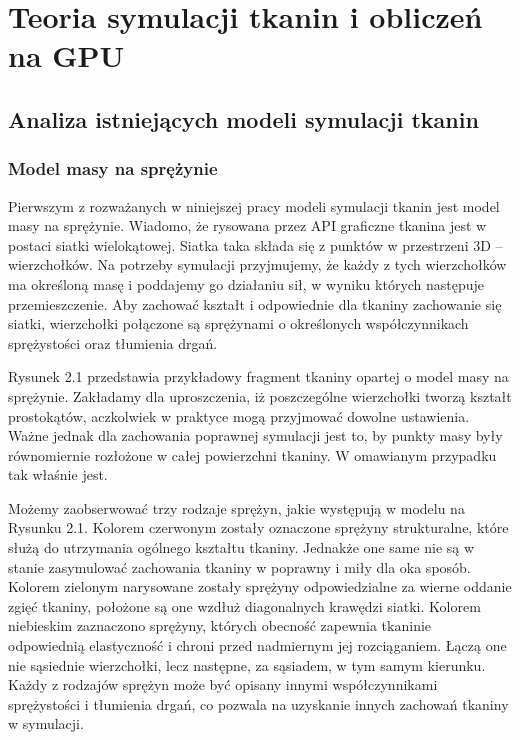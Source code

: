 \chapter{Teoria symulacji tkanin i obliczeń na GPU}
\label{t:teoria}


	\section{Analiza istniejących modeli symulacji tkanin}
	\label{t:teoria:analiza}
	
		\subsection{Model masy na sprężynie}
		\label{t:teoria:analiza:masa}		
			
			Pierwszym z rozważanych w niniejszej pracy modeli symulacji tkanin jest model masy na sprężynie. Wiadomo, że rysowana przez API graficzne tkanina jest w postaci siatki wielokątowej. Siatka taka składa się z punktów w przestrzeni 3D -- wierzchołków. Na potrzeby symulacji przyjmujemy, że każdy z tych wierzchołków ma określoną masę i poddajemy go działaniu sił, w wyniku których następuje przemieszczenie. Aby zachować kształt i odpowiednie dla tkaniny zachowanie się siatki, wierzchołki połączone są sprężynami o określonych współczynnikach sprężystości oraz tłumienia drgań. 
			
			
			
			
			Rysunek 2.1 przedstawia przykładowy fragment tkaniny opartej o model masy na sprężynie. Zakładamy dla uproszczenia, iż poszczególne wierzchołki tworzą kształt prostokątów, aczkolwiek w praktyce mogą przyjmować dowolne ustawienia. Ważne jednak dla zachowania poprawnej symulacji jest to, by punkty masy były równomiernie rozłożone w całej powierzchni tkaniny. W omawianym przypadku tak właśnie jest. 
			
			Możemy zaobserwować trzy rodzaje sprężyn, jakie występują w modelu na Rysunku 2.1. Kolorem czerwonym zostały oznaczone sprężyny strukturalne, które służą do utrzymania ogólnego kształtu tkaniny. Jednakże one same nie są w stanie zasymulować zachowania tkaniny w poprawny i miły dla oka sposób. Kolorem zielonym narysowane zostały sprężyny odpowiedzialne za wierne oddanie zgięć tkaniny, położone są one wzdłuż diagonalnych krawędzi siatki. Kolorem niebieskim zaznaczono sprężyny, których obecność zapewnia tkaninie odpowiednią elastyczność i chroni przed nadmiernym jej rozciąganiem. Łączą one nie sąsiednie wierzchołki, lecz następne, za sąsiadem, w tym samym kierunku. Każdy z rodzajów sprężyn może być opisany innymi współczynnikami sprężystości i tłumienia drgań, co pozwala na uzyskanie innych zachowań tkaniny w symulacji.
			
